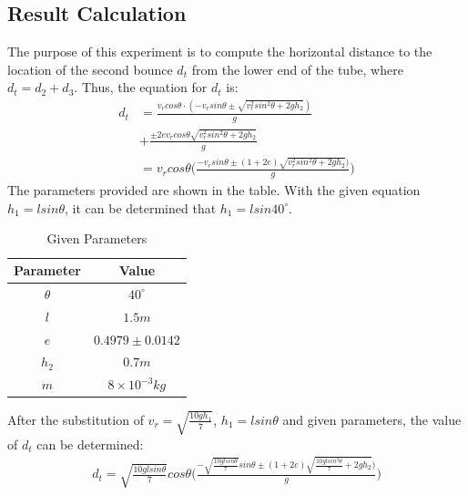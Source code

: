 \documentclass{article}
\begin{document}
    \subsection{Result Calculation}
            The purpose of this experiment is to compute the horizontal distance to the location of the second bounce $d_t$ from the lower end of the tube, where $d_t = d_2 + d_3$. Thus, the equation for $d_t$ is:
            \begin{equation}\label{d_t}
                \begin{aligned}
                    d_t &= \frac{v_rcos\theta \cdot (-v_{r}sin\theta\pm\sqrt{{v^2_{r}sin^2\theta}+2gh_2})}{g}\\&+\frac{\pm2ev_rcos\theta\sqrt{{v^2_{r}sin^2\theta}+2gh_2}}{g} \\
                    &= v_rcos\theta \Big(\frac{-v_rsin\theta\pm(1+2e)\sqrt{{v^2_{r}sin^2\theta}+2gh_2})}{g}\Big)
                \end{aligned}
            \end{equation}
            The parameters provided are shown in the table. With the given equation $h_1 = lsin\theta$, it can be determined that $h_1 = lsin40^\circ$.
            \begin{table}[H]
                \caption {Given Parameters} \label{parameters} 
                \begin{center}
                    \begin{tabular}{cc}
                        \hline
                        Parameter & Value \\
                        \hline
                        $\theta$     & $40^\circ$     \\
                        $l$         & $1.5m$     \\
                        $e$         & $0.4979 \pm 0.0142$     \\
                        $h_2$        & $0.7m$     \\
                        $m$         & $8\times10^{-3}kg$     \\
                        \hline
                    \end{tabular}
                \end{center}
            \end{table}
            After the substitution of  $v_r = \sqrt{\frac{10gh_1}{7}}$, $h_1 = lsin\theta$ and given parameters, the value of $d_t$ can be determined:
            \begin{equation}
                \begin{aligned}
                    d_t = \sqrt{\frac{10glsin\theta}{7}}cos\theta \Big(\frac{-\sqrt{\frac{10glsin\theta}{7}}sin\theta\pm(1+2e)\sqrt{\frac{10glsin^3\theta}{7}+2gh_2})}{g}\Big)
                \end{aligned}
            \end{equation}
\end{document}
